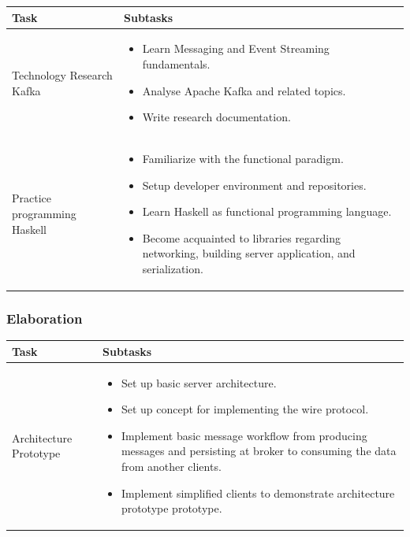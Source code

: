 \begin{tabular}[H]{|p{6cm}|p{10cm}|}\hline
    \textbf{Task} & \textbf{Subtasks} \\ \hline
    Technology Research Kafka & 
        \begin{itemize}
            \item Learn Messaging and Event Streaming fundamentals.
            \item Analyse Apache Kafka and related topics. 
            \item Write research documentation.
        \end{itemize} \\ \hline
    Practice programming Haskell & 
        \begin{itemize}
            \item Familiarize with the functional paradigm.
            \item Setup developer environment and repositories. 
            \item Learn Haskell as functional programming language.
            \item Become acquainted to libraries regarding networking,
              building server application, and serialization.
        \end{itemize} \\ \hline
\end{tabular}

\subsubsection{Elaboration}
\begin{tabular}[H]{|p{6cm}|p{10cm}|}\hline
   \textbf{Task} & \textbf{Subtasks} \\ \hline
    Architecture Prototype &
        \begin{itemize}
            \item Set up basic server architecture.
            \item Set up concept for implementing the wire protocol.
            \item Implement basic message workflow from producing messages and
            persisting at broker to consuming the data from another clients.
            \item Implement simplified clients to demonstrate architecture
                prototype prototype.
        \end{itemize} \\ \hline
   \end{tabular}

